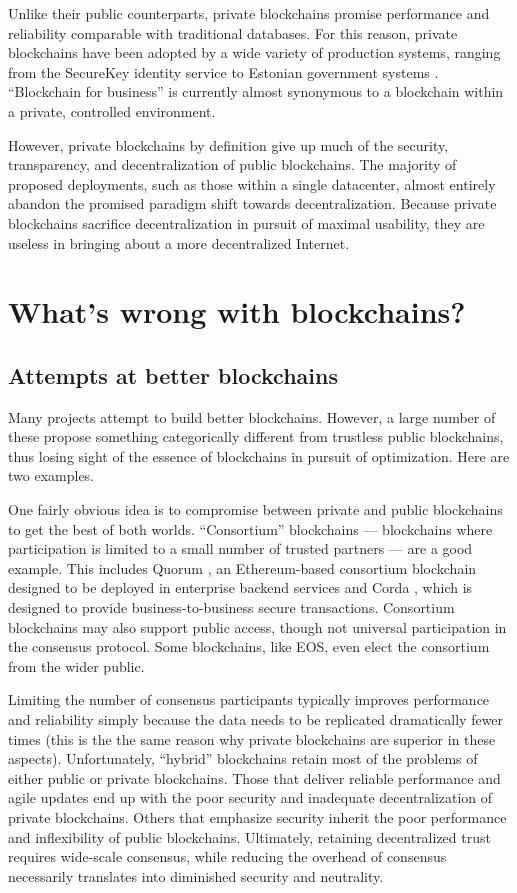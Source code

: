\documentclass[headinclude,12pt]{scrbook}
\begin{document}
Unlike their public counterparts, private blockchains promise performance and reliability comparable with traditional databases. For this reason, private blockchains have been adopted by a wide variety of production systems, ranging from the SecureKey identity service \cite{securekey} to Estonian government systems \cite{estonia}. ``Blockchain for business'' is currently almost synonymous to a blockchain within a private, controlled environment.

However, private blockchains by definition give up much of the security, transparency, and decentralization of public blockchains. The majority of proposed deployments, such as those within a single datacenter, almost entirely abandon the promised paradigm shift towards decentralization. Because private blockchains sacrifice decentralization in pursuit of maximal usability, they are useless in bringing about a more decentralized Internet.


\section{What's wrong with blockchains?}

\subsection{Attempts at better blockchains}

Many projects attempt to build better blockchains. However, a large number of these propose something categorically different from trustless public blockchains, thus losing sight of the essence of blockchains in pursuit of optimization. Here are two examples.

One fairly obvious idea is to compromise between private and public blockchains to get the best of both worlds. ``Consortium'' blockchains --- blockchains where participation is limited to a small number of trusted partners --- are a good example. This includes Quorum \cite{quorum}, an Ethereum-based consortium blockchain designed to be deployed in enterprise backend services and Corda \cite{corda}, which is designed to provide business-to-business secure transactions.  Consortium blockchains may also support public access, though not universal participation in the consensus protocol. Some blockchains, like EOS, even elect the consortium from the wider public.

Limiting the number of consensus participants typically improves performance and reliability simply because the data needs to be replicated dramatically fewer times (this is the the same reason why private blockchains are superior in these aspects). Unfortunately, ``hybrid'' blockchains retain most of the problems of either public or private blockchains. Those that deliver reliable performance and agile updates end up with the poor security and inadequate decentralization of private blockchains. Others that emphasize security inherit the poor performance and inflexibility of public blockchains. Ultimately, retaining decentralized trust requires wide-scale consensus, while reducing the overhead of consensus necessarily translates into diminished security and neutrality.
\end{document}
